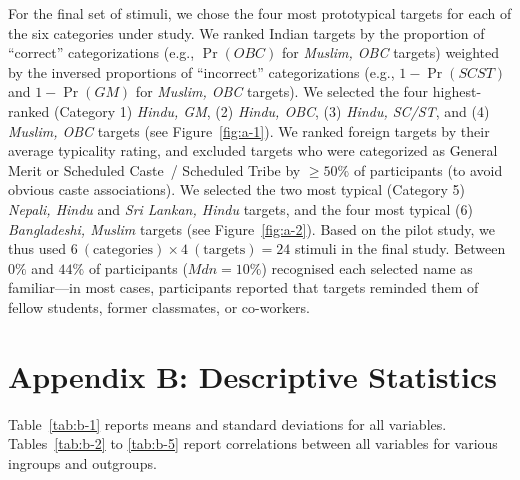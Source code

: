 \documentclass[12pt, a4paper]{article}
\begin{document}
For the final set of stimuli, we chose the four most prototypical targets for each of the six categories under study. We ranked Indian targets by the proportion of ``correct'' categorizations (e.g., $\Pr(\textit{OBC})$ for \emph{Muslim, OBC} targets) weighted by the inversed proportions of ``incorrect'' categorizations (e.g., $1 - \Pr(\textit{SCST})$ and $1 - \Pr(\textit{GM})$ for \emph{Muslim, OBC} targets). We selected the four highest-ranked (Category 1) \emph{Hindu, GM}, (2) \emph{Hindu, OBC}, (3) \emph{Hindu, SC/ST}, and (4) \emph{Muslim, OBC} targets (see Figure~\ref{fig:a-1}). We ranked foreign targets by their average typicality rating, and excluded targets who were categorized as General Merit or Scheduled Caste~/ Scheduled Tribe by $\ge 50\%$ of participants (to avoid obvious caste associations). We selected the two most typical (Category 5) \emph{Nepali, Hindu} and \emph{Sri Lankan, Hindu} targets, and the four most typical (6) \emph{Bangladeshi, Muslim} targets (see Figure~\ref{fig:a-2}). Based on the pilot study, we thus used $6~(\text{categories}) \times 4~(\text{targets}) = 24$ stimuli in the final study. Between $0\%$ and $44\%$ of participants ($\textit{Mdn} = 10\%$) recognised each selected name as familiar---in most cases, participants reported that targets reminded them of fellow students, former classmates, or co-workers.

\section{Appendix B: Descriptive Statistics}

Table~\ref{tab:b-1} reports means and standard deviations for all variables. Tables~\ref{tab:b-2} to \ref{tab:b-5} report correlations between all variables for various ingroups and outgroups.
\end{document}
